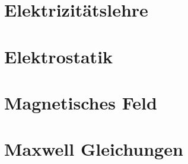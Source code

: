 \documentclass[numerate]{cheatsheet}
\author{Noa Sendlhofer \& Christian Leser \\ nsendlhofer \& cleser \\ \vspace*{-0.2em}}
\begin{document}
\section{Elektrizitätslehre}
    
    
    
    
    
    

\section{Elektrostatik}
    
    
    
    
    
    
    
    \vfill \null \columnbreak
    

\section{Magnetisches Feld}
    
    
    
    
    
    
    
    
    
    
    
    
    
    \vfill \null \columnbreak
    
    

\section{Maxwell Gleichungen}
    
\end{document}
